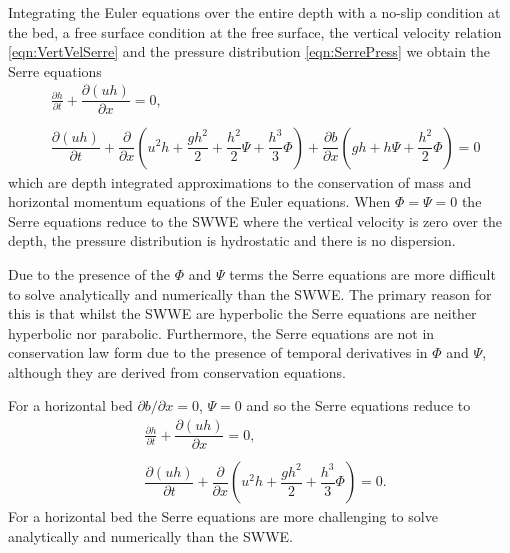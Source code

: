 Integrating the Euler equations \cite{Su-Gardener-1969-536,Zoppou-2014} over the entire depth with a no-slip condition at the bed, a free surface condition at the free surface, the vertical velocity relation \eqref{eqn:VertVelSerre} and the pressure distribution \eqref{eqn:SerrePress} we obtain the Serre equations
\begin{subequations}
	\begin{align}
	&\frac{\partial h}{\partial t} + \dfrac{\partial (uh)}{\partial x} = 0,  \label{eqn:FullSerreNonConMass} \\ \nonumber \\
	&\dfrac{\partial (uh)}{\partial t} + \dfrac{\partial}{\partial x} \left ( u^2h + \dfrac{gh^2}{2} + \dfrac{h^2}{2}{\Psi} + \dfrac{h^3}{3}{ \Phi }  \right )  +  \dfrac{\partial b}{\partial x} \left (gh +   h \Psi + \dfrac{h^2}{2}{ \Phi }  \right ) = 0	\label{eqn:FullSerreNonConMome}
	\end{align}
	\label{eqn:FullSerreNonCon}
\end{subequations}
which are depth integrated approximations to the conservation of mass and horizontal momentum equations of the Euler equations.
When $\Phi = \Psi = 0$ the Serre equations reduce to the SWWE where the vertical velocity is zero over the depth, the pressure distribution is hydrostatic and there is no dispersion. 

Due to the presence of the $\Phi$ and $\Psi$ terms the Serre equations are more difficult to solve analytically and numerically than the SWWE. The primary reason for this is that whilst the SWWE are hyperbolic the Serre equations are neither hyperbolic nor parabolic. Furthermore, the Serre equations are not in conservation law form due to the presence of temporal derivatives in $\Phi$ and $\Psi$, although they are derived from conservation equations. 

For a horizontal bed $\partial b / \partial x = 0$, $\Psi = 0$ and so the Serre equations reduce to
\begin{subequations}
	\label{eqn:FullSerreNonConHorizbed}
	\begin{align}
	\label{eqn:FullSerreNonConMassHorizbed}
	&\frac{\partial h}{\partial t} + \dfrac{\partial (uh)}{\partial x} = 0, \\ \nonumber \\
	\label{eqn:FullSerreNonConMomeHorizbed}
	&\dfrac{\partial (uh)}{\partial t} + \dfrac{\partial}{\partial x} \left ( u^2h + \dfrac{gh^2}{2} + \dfrac{h^3}{3}{ \Phi }  \right ) = 0.
	\end{align}
\end{subequations}	
For a horizontal bed the Serre equations are more challenging to solve analytically and numerically than the SWWE. 

